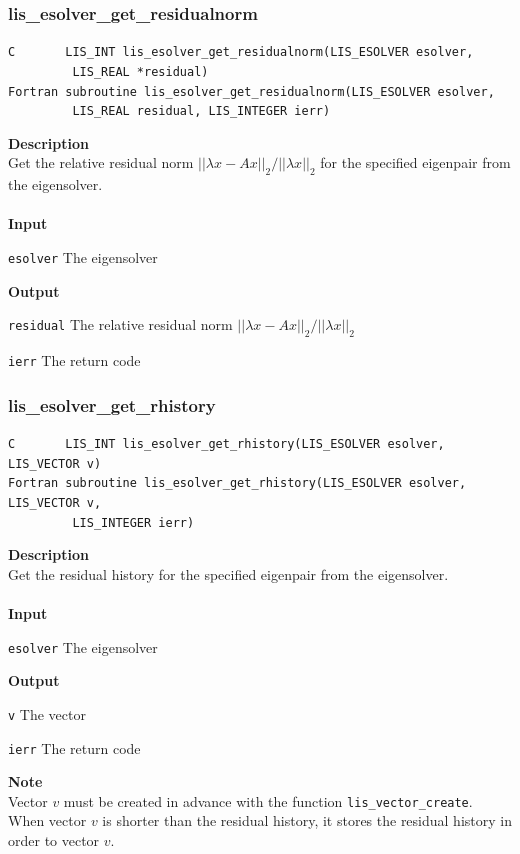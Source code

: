 \documentclass[a4paper]{article}
\newcommand{\namelistlabel}[1]{\mbox{#1}\hfill}
\newenvironment{namelist}[1]{%
\begin{list}{}
  {\let\makelabel\namelistlabel
  \settowidth{\labelwidth}{#1}
  \setlength{\leftmargin}{1.1\labelwidth}}
  }{%
\end{list}}
\begin{document}
\subsubsection{lis\_esolver\_get\_residualnorm}
\begin{screen}
\verb|C       LIS_INT lis_esolver_get_residualnorm(LIS_ESOLVER esolver,|\\
\verb|         LIS_REAL *residual)|\\
\verb|Fortran subroutine lis_esolver_get_residualnorm(LIS_ESOLVER esolver,|\\
\verb|         LIS_REAL residual, LIS_INTEGER ierr)|
\end{screen}
{\bf Description}\\
\indent
Get the relative residual norm $||\lambda x-Ax||_2/||\lambda x||_2$ for the specified eigenpair from the eigensolver.
\\ \\
\noindent
{\bf Input}
\begin{namelist}{XXXXXXXXXXXXXXXXXXXX}
\item[\tt esolver] The eigensolver
\end{namelist}
{\bf Output}
\begin{namelist}{XXXXXXXXXXXXXXXXXXXX}
\item[\tt residual]  The relative residual norm $||\lambda x-Ax||_2/||\lambda x||_2$
\item[\tt ierr] The return code
\end{namelist}

\newpage
\subsubsection{lis\_esolver\_get\_rhistory}
\begin{screen}
\verb|C       LIS_INT lis_esolver_get_rhistory(LIS_ESOLVER esolver, LIS_VECTOR v)|\\
\verb|Fortran subroutine lis_esolver_get_rhistory(LIS_ESOLVER esolver, LIS_VECTOR v,|\\
\verb|         LIS_INTEGER ierr)|
\end{screen}
{\bf Description}\\
\indent
Get the residual history for the specified eigenpair from the eigensolver.
\\ \\
\noindent
{\bf Input}
\begin{namelist}{XXXXXXXXXXXXXXXXXXXX}
\item[\tt esolver] The eigensolver
\end{namelist}
{\bf Output}
\begin{namelist}{XXXXXXXXXXXXXXXXXXXX}
\item[\tt v] The vector
\item[\tt ierr] The return code
\end{namelist}
{\bf Note}\\
\indent
Vector $v$ must be created in advance with the function \verb|lis_vector_create|. 
When vector $v$ is shorter than the residual history, 
it stores the residual history in order to vector $v$.
\end{document}
